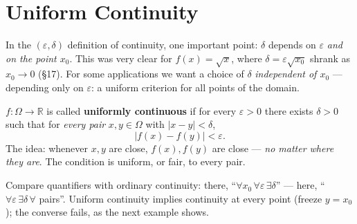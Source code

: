 \documentclass[11pt]{report}
\begin{document}

\section{Uniform Continuity}

In the $(\varepsilon, \delta)$ definition of continuity, one important point: $\delta$ depends on $\varepsilon$ \emph{and on the point $x_0$}. This was very clear for $f(x) = \sqrt{x}$, where $\delta = \varepsilon\sqrt{x_0}$ shrank as $x_0 \to 0$ (\S 17). For some applications we want a choice of $\delta$ \emph{independent of $x_0$} --- depending only on $\varepsilon$: a uniform criterion for all points of the domain.

\begin{defbox}
$f: \Omega \to \mathbb{R}$ is called \textbf{uniformly continuous} if for every $\varepsilon > 0$ there exists $\delta > 0$ such that for \emph{every pair} $x, y \in \Omega$ with $|x - y| < \delta$,
\[
|f(x) - f(y)| < \varepsilon.
\]
The idea: whenever $x, y$ are close, $f(x), f(y)$ are close --- \emph{no matter where they are}. The condition is uniform, or fair, to every pair.
\end{defbox}

\begin{rembox}
Compare quantifiers with ordinary continuity: there, ``$\forall x_0\, \forall \varepsilon\, \exists \delta$'' --- here, ``$\forall \varepsilon\, \exists \delta\, \forall$ pairs''. Uniform continuity implies continuity at every point (freeze $y = x_0$); the converse fails, as the next example shows.
\end{rembox}
\end{document}

